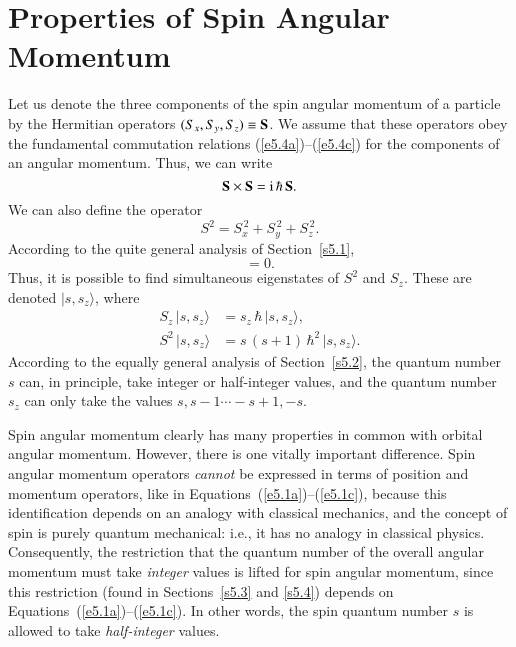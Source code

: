 \section{Properties of Spin Angular Momentum}
Let us denote the three components of the spin angular momentum of a
particle by the Hermitian operators
 $(S_x, S_y, S_z)\equiv {\bf S}$. We assume that these 
operators obey the fundamental commutation relations (\ref{e5.4a})--(\ref{e5.4c}) for the components
of an angular momentum. Thus, we can write
\begin{equation}\label{e5.100}
{\bf S} \times {\bf S} = {\rm i}\,\hbar \, {\bf S}.
\end{equation}
We can also define the operator
\begin{equation}
S^2 = S_x^{\,2}+S_y^{\,2} + S_z^{\,2}.
\end{equation}
According to the quite general analysis of Section~\ref{s5.1},
\begin{equation}
[{\bf S}, S^2] = 0.
\end{equation}
Thus, it is possible to find simultaneous eigenstates of $S^2$ and $S_z$. 
These are denoted $|s, s_z\rangle$, where
\begin{align}
S_z \,|s, s_z\rangle &= s_z \,\hbar \,|s, s_z\rangle,\\[0.5ex]
S^2 \,|s, s_z\rangle &= s\,(s+1)\,\hbar^2\, |s, s_z\rangle.
\end{align}
According to the equally general
analysis of Section~\ref{s5.2}, the quantum number $s$ can, in principle, 
take integer or half-integer values,
and the quantum number $s_z$ can only take the values $s, s-1 \cdots -s+1, -s$. 

Spin angular momentum clearly has many properties in common with
orbital angular momentum. However, there is one vitally important difference. 
Spin angular momentum operators {\em cannot}\/ be expressed  in terms of
position and momentum operators, like  in Equations~(\ref{e5.1a})--(\ref{e5.1c}), because this 
identification depends on an analogy with classical mechanics, and the concept
of spin is purely quantum mechanical: {\rm i.e.}, it has no analogy in classical physics. 
Consequently, the restriction that the quantum number of the overall angular
momentum must take {\em integer}\/ values is lifted for spin angular momentum,
since this restriction (found in Sections~\ref{s5.3} and \ref{s5.4}) depends on Equations~(\ref{e5.1a})--(\ref{e5.1c}).
In other words, the spin quantum number $s$ is allowed to take {\em half-integer}\/ values.

